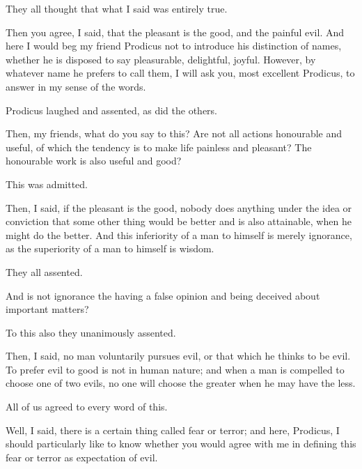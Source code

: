 \documentclass[11pt,letter]{article}
\begin{document}
\par  They all thought that what I said was entirely true.

\par  Then you agree, I said, that the pleasant is the good, and the painful evil. And here I would beg my friend Prodicus not to introduce his distinction of names, whether he is disposed to say pleasurable, delightful, joyful. However, by whatever name he prefers to call them, I will ask you, most excellent Prodicus, to answer in my sense of the words.

\par  Prodicus laughed and assented, as did the others.

\par  Then, my friends, what do you say to this? Are not all actions honourable and useful, of which the tendency is to make life painless and pleasant? The honourable work is also useful and good?

\par  This was admitted.

\par  Then, I said, if the pleasant is the good, nobody does anything under the idea or conviction that some other thing would be better and is also attainable, when he might do the better. And this inferiority of a man to himself is merely ignorance, as the superiority of a man to himself is wisdom.

\par  They all assented.

\par  And is not ignorance the having a false opinion and being deceived about important matters?

\par  To this also they unanimously assented.

\par  Then, I said, no man voluntarily pursues evil, or that which he thinks to be evil. To prefer evil to good is not in human nature; and when a man is compelled to choose one of two evils, no one will choose the greater when he may have the less.

\par  All of us agreed to every word of this.

\par  Well, I said, there is a certain thing called fear or terror; and here, Prodicus, I should particularly like to know whether you would agree with me in defining this fear or terror as expectation of evil.
\end{document}
